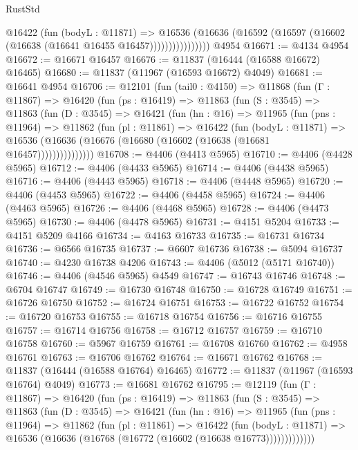 \begin{lexlean}{RustStd}
\begin{coremodule}
                    @16422
                      (fun (bodyL : @11871) =>
                      @16536
                        (@16636
                          (@16592 (@16597 (@16602 (@16638 (@16641 @16455 @16457))))))))))))))))
    @4954
@16671 := @4134 @4954
@16672 := @16671 @16457
@16676 := @11837 (@16444 (@16588 @16672) @16465)
@16680 := @11837 (@11967 (@16593 @16672) @4049)
@16681 := @16641 @4954
@16706 := @12101
    (fun (tail0 : @4150) =>
    @11868
      (fun (Γ : @11867) =>
      @16420
        (fun (ps : @16419) =>
        @11863
          (fun (S : @3545) =>
          @11863
            (fun (D : @3545) =>
            @16421
              (fun (hn : @16) =>
              @11965
                (fun (pns : @11964) =>
                @11862
                  (fun (pl : @11861) =>
                  @16422
                    (fun (bodyL : @11871) =>
                    @16536 (@16636 (@16676 (@16680 (@16602 (@16638 (@16681 @16457)))))))))))))))
@16708 := @4406 (@4413 @5965)
@16710 := @4406 (@4428 @5965)
@16712 := @4406 (@4433 @5965)
@16714 := @4406 (@4438 @5965)
@16716 := @4406 (@4443 @5965)
@16718 := @4406 (@4448 @5965)
@16720 := @4406 (@4453 @5965)
@16722 := @4406 (@4458 @5965)
@16724 := @4406 (@4463 @5965)
@16726 := @4406 (@4468 @5965)
@16728 := @4406 (@4473 @5965)
@16730 := @4406 (@4478 @5965)
@16731 := @4151 @5204
@16733 := @4151 @5209 @4166
@16734 := @4163 @16733
@16735 := @16731 @16734
@16736 := @6566 @16735
@16737 := @6607 @16736
@16738 := @5094 @16737
@16740 := @4230 @16738 @4206
@16743 := @4406 (@5012 (@5171 @16740))
@16746 := @4406 (@4546 @5965) @4549
@16747 := @16743 @16746
@16748 := @6704 @16747
@16749 := @16730 @16748
@16750 := @16728 @16749
@16751 := @16726 @16750
@16752 := @16724 @16751
@16753 := @16722 @16752
@16754 := @16720 @16753
@16755 := @16718 @16754
@16756 := @16716 @16755
@16757 := @16714 @16756
@16758 := @16712 @16757
@16759 := @16710 @16758
@16760 := @5967 @16759
@16761 := @16708 @16760
@16762 := @4958 @16761
@16763 := @16706 @16762
@16764 := @16671 @16762
@16768 := @11837 (@16444 (@16588 @16764) @16465)
@16772 := @11837 (@11967 (@16593 @16764) @4049)
@16773 := @16681 @16762
@16795 := @12119
    (fun (Γ : @11867) =>
    @16420
      (fun (ps : @16419) =>
      @11863
        (fun (S : @3545) =>
        @11863
          (fun (D : @3545) =>
          @16421
            (fun (hn : @16) =>
            @11965
              (fun (pns : @11964) =>
              @11862
                (fun (pl : @11861) =>
                @16422
                  (fun (bodyL : @11871) =>
                  @16536 (@16636 (@16768 (@16772 (@16602 (@16638 @16773)))))))))))))

\end{coremodule}
\end{lexlean}
